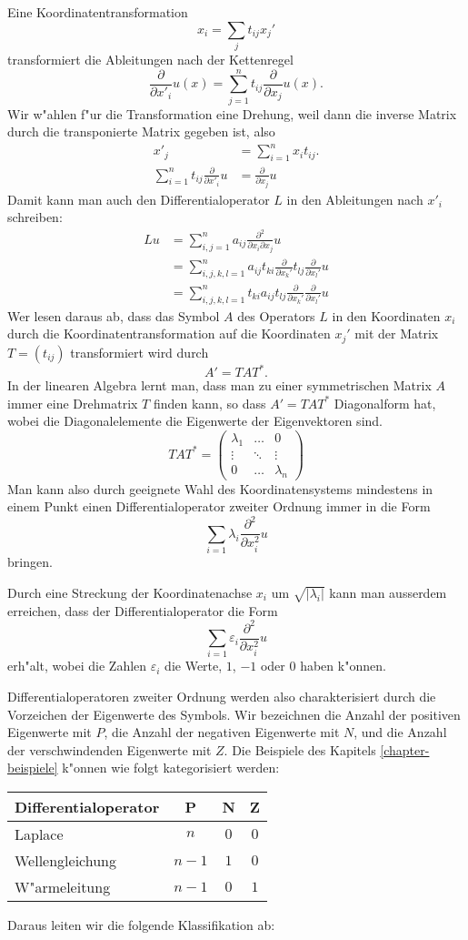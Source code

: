 Eine Koordinatentransformation
$$x_i=\sum_{j}t_{ij}x_j'$$
transformiert die Ableitungen nach der Kettenregel
$$\frac{\partial}{\partial x'_i}u(x)=\sum_{j=1}^nt_{ij}\frac{\partial}{\partial x_j}u(x).$$
Wir w"ahlen f"ur die Transformation eine Drehung, weil dann die
inverse Matrix durch die transponierte Matrix gegeben ist, also
\begin{align*}
x'_j&=\sum_{i=1}^nx_it_{ij}.
\\
\sum_{i=1}^nt_{ij}\frac{\partial}{\partial x'_i}u&=\frac{\partial}{\partial x_j}u
\end{align*}
Damit kann man auch den Differentialoperator $L$ in den Ableitungen nach $x'_i$
schreiben:
\begin{align*}
Lu&=\sum_{i,j=1}^na_{ij}\frac{\partial^2}{\partial x_i\partial x_j}u
\\
&=\sum_{i,j,k,l=1}^n a_{ij}
t_{ki}\frac{\partial}{\partial x_k'}
t_{lj}\frac{\partial}{\partial x_l'}u
\\
&=\sum_{i,j,k,l=1}^n
t_{ki}a_{ij}t_{lj}\frac{\partial}{\partial x_k'}
\frac{\partial}{\partial x_l'}u
\end{align*}
Wer lesen daraus ab, dass das Symbol $A$ des Operators $L$ in den Koordinaten
$x_i$ durch die Koordinatentransformation auf die Koordinaten $x_j'$ 
mit der Matrix $T=(t_{ij})$ transformiert wird durch
$$A'=TAT^*.$$
In der linearen Algebra lernt man, dass man zu einer symmetrischen
Matrix $A$ immer eine Drehmatrix $T$ finden kann, so dass
$A'=TAT^*$ Diagonalform hat, wobei die Diagonalelemente die
Eigenwerte der Eigenvektoren sind.
$$
TAT^*
=
\begin{pmatrix}\lambda_1&\dots&0\\
\vdots&\ddots&\vdots\\
0&\dots&\lambda_n
\end{pmatrix}
$$
Man kann also durch geeignete Wahl des Koordinatensystems mindestens in
einem Punkt einen Differentialoperator zweiter Ordnung immer in die
Form
$$\sum_{i=1}\lambda_i\frac{\partial^2}{\partial x_i^2}u$$
bringen.

Durch eine Streckung der Koordinatenachse $x_i$ um $\sqrt{|\lambda_i|}$
kann man ausserdem erreichen, dass der Differentialoperator die
Form
$$\sum_{i=1}\varepsilon_i\frac{\partial^2}{\partial x_i^2}u$$
erh"alt, wobei die Zahlen $\varepsilon_i$ die Werte, $1$, $-1$ oder $0$
haben k"onnen.

Differentialoperatoren zweiter Ordnung werden also charakterisiert durch
die Vorzeichen der Eigenwerte des Symbols. Wir bezeichnen die Anzahl
der positiven Eigenwerte mit $P$, die Anzahl der negativen Eigenwerte
mit $N$, und die Anzahl der verschwindenden Eigenwerte mit $Z$.
Die Beispiele des Kapitels \ref{chapter-beispiele} k"onnen wie
folgt kategorisiert werden:
\begin{center}
\begin{tabular}{l|ccc}
Differentialoperator&P&N&Z
\\
\hline
Laplace&
$n$&$0$&$0$
\\
Wellengleichung&
$n-1$&$1$&$0$
\\
W"armeleitung&
$n-1$&$0$&$1$
\end{tabular}
\end{center}
Daraus leiten wir die folgende Klassifikation ab:

